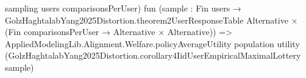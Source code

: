 \documentclass[10pt]{article}
\begin{document}
\begin{ReviewVerbatim}
                                                sampling users comparisonsPerUser)
                                              fun
                                                (sample :
                                                  Fin users →
                                                    GolzHaghtalabYang2025Distortion.theorem2UserResponseTable
                                                        Alternative ×
                                                      (Fin comparisonsPerUser → Alternative × Alternative)) =>
                                              AppliedModelingLib.Alignment.Welfare.policyAverageUtility population
                                                utility
                                                (GolzHaghtalabYang2025Distortion.corollary4IidUserEmpiricalMaximalLottery
                                                  sample)
\end{ReviewVerbatim}
\end{document}
